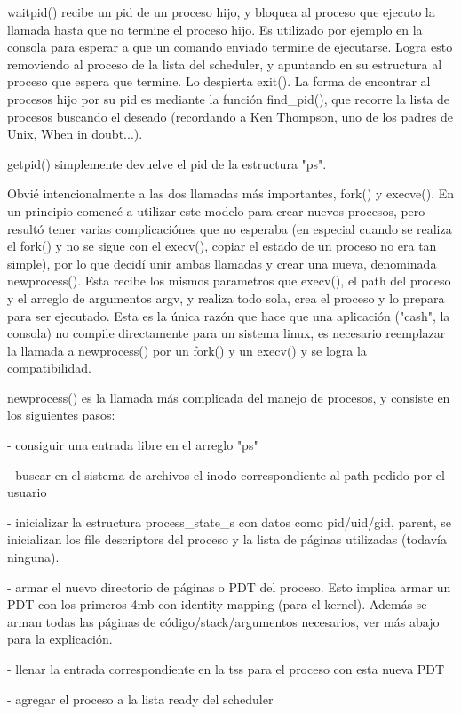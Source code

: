 waitpid() recibe un pid de un proceso hijo, y bloquea al proceso que ejecuto la
llamada hasta que no termine el proceso hijo. Es utilizado por ejemplo en la
consola para esperar a que un comando enviado termine de ejecutarse. Logra esto
removiendo al proceso de la lista del scheduler, y apuntando en su estructura
al proceso que espera que termine. Lo despierta exit(). La forma de encontrar
al procesos hijo por su pid es mediante la función find\_pid(), que recorre la
lista de procesos buscando el deseado (recordando a Ken Thompson, uno de los
padres de Unix, When in doubt...).

getpid() simplemente devuelve el pid de la estructura "ps".

Obvié intencionalmente a las dos llamadas más importantes, fork() y execve().
En un principio comencé a utilizar este modelo para crear nuevos procesos, pero
resultó tener varias complicaciónes que no esperaba (en especial cuando se
realiza el fork() y no se sigue con el execv(), copiar el estado de un proceso
no era tan simple), por lo que decidí unir ambas llamadas y crear una nueva,
denominada newprocess(). Esta recibe los mismos parametros que execv(), el path
del proceso y el arreglo de argumentos argv, y realiza todo sola, crea el
proceso y lo prepara para ser ejecutado. Esta es la única razón que hace que
una aplicación ("cash", la consola) no compile directamente para un sistema
linux, es necesario reemplazar la llamada a newprocess() por un fork() y un
execv() y se logra la compatibilidad.

newprocess() es la llamada más complicada del manejo de procesos, y consiste en
los siguientes pasos:

- consiguir una entrada libre en el arreglo "ps"

- buscar en el sistema de archivos el inodo correspondiente al path pedido
por el usuario

- inicializar la estructura process\_state\_s con datos como pid/uid/gid,
parent, se inicializan los file descriptors del proceso y la lista de páginas
utilizadas (todavía ninguna).

- armar el nuevo directorio de páginas o PDT del proceso. Esto implica armar
un PDT con los primeros 4mb con identity mapping (para el kernel). Además se
arman todas las páginas de código/stack/argumentos necesarios, ver más abajo
para la explicación.

- llenar la entrada correspondiente en la tss para el proceso con esta nueva
PDT

- agregar el proceso a la lista ready del scheduler

